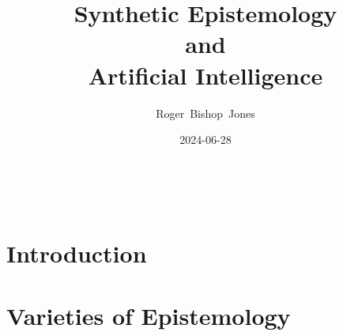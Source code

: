 \documentclass[10pt,titlepage]{book}
\title{\bf\LARGE Synthetic  Epistemology\\ and\\ Artificial Intelligence}
\author{Roger~Bishop~Jones}
\date{\small 2024-06-28}
\newcommand{\ignore}[1]{}
\begin{document}

%
                               
\begin{titlepage}
\maketitle





\end{titlepage}

\ \

\ignore{
\begin{centering}
{}
\end{centering}
}%

\setcounter{tocdepth}{2}
{\parskip-0pt\tableofcontents}




\chapter{Introduction}



\chapter{Varieties of Epistemology}






{}



\label{index}
{\twocolumn[]
{\small\printindex}}





\end{document}
